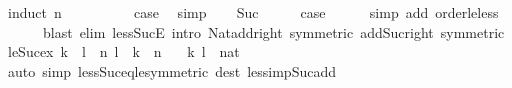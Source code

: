\begin{isabellebody}
%
\isadelimproof
%
\endisadelimproof
%
\isatagproof
{}\isamarkupfalse%
\ {\isacharparenleft}{\kern0pt}induct\ n{\isacharparenright}{\kern0pt}\isanewline
\ \ \isamarkupfalse%
\ {}\isanewline
\ \ \isamarkupfalse%
\ \isamarkupfalse%
\ {\isacharquery}{\kern0pt}case\ \isamarkupfalse%
\ simp\isanewline
{}\isamarkupfalse%
\isanewline
\ \ \isamarkupfalse%
\ Suc\isanewline
\ \ \isamarkupfalse%
\ \isamarkupfalse%
\ {\isacharquery}{\kern0pt}case\isanewline
\ \ \ \ \isamarkupfalse%
\ {\isacharparenleft}{\kern0pt}simp\ add{\isacharcolon}{\kern0pt}\ order{\isacharunderscore}{\kern0pt}le{\isacharunderscore}{\kern0pt}less{\isacharparenright}{\kern0pt}\isanewline
\ \ \ \ \ \ {\isacharparenleft}{\kern0pt}blast\ elim{\isacharbang}{\kern0pt}{\isacharcolon}{\kern0pt}\ less{\isacharunderscore}{\kern0pt}SucE\ intro{\isacharbang}{\kern0pt}{\isacharcolon}{\kern0pt}\ Nat{\isachardot}{\kern0pt}add{\isacharunderscore}{\kern0pt}{}{\isacharunderscore}{\kern0pt}right\ {\isacharbrackleft}{\kern0pt}symmetric{\isacharbrackright}{\kern0pt}\ add{\isacharunderscore}{\kern0pt}Suc{\isacharunderscore}{\kern0pt}right\ {\isacharbrackleft}{\kern0pt}symmetric{\isacharbrackright}{\kern0pt}{\isacharparenright}{\kern0pt}\isanewline
{}\isamarkupfalse%
%
\endisatagproof
{\isafoldproof}%
%
\isadelimproof
\isanewline
%
\endisadelimproof
\isanewline
{}\isamarkupfalse%
\ le{\isacharunderscore}{\kern0pt}Suc{\isacharunderscore}{\kern0pt}ex{\isacharcolon}{\kern0pt}\ {\isachardoublequoteopen}k\ {\isasymle}\ l\ {\isasymLongrightarrow}\ {\isacharparenleft}{\kern0pt}{\isasymexists}n{\isachardot}{\kern0pt}\ l\ {\isacharequal}{\kern0pt}\ k\ {\isacharplus}{\kern0pt}\ n{\isacharparenright}{\kern0pt}{\isachardoublequoteclose}\isanewline
\ \ \ k\ l\ {\isacharcolon}{\kern0pt}{\isacharcolon}{\kern0pt}\ nat\isanewline
%
\isadelimproof
\ \ %
\endisadelimproof
%
\isatagproof
{}\isamarkupfalse%
\ {\isacharparenleft}{\kern0pt}auto\ simp{\isacharcolon}{\kern0pt}\ less{\isacharunderscore}{\kern0pt}Suc{\isacharunderscore}{\kern0pt}eq{\isacharunderscore}{\kern0pt}le{\isacharbrackleft}{\kern0pt}symmetric{\isacharbrackright}{\kern0pt}\ dest{\isacharcolon}{\kern0pt}\ less{\isacharunderscore}{\kern0pt}imp{\isacharunderscore}{\kern0pt}Suc{\isacharunderscore}{\kern0pt}add{\isacharparenright}{\kern0pt}%
\endisatagproof
{\isafoldproof}%
%
\isadelimproof
\isanewline
%
\endisadelimproof
\isanewline

\end{isabellebody}
